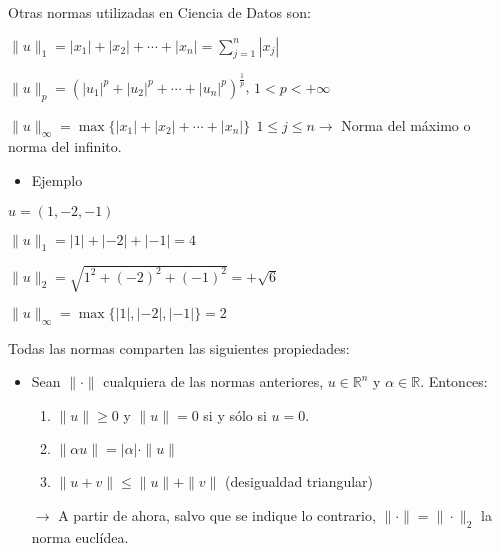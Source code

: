 \documentclass[12pt]{article}
\begin{document}
Otras normas utilizadas en Ciencia de Datos son:

$\|u\|_1=|x_1|+|x_2|+\cdots+|x_n|=\sum_{j=1}^{n}|x_j|$

$\|u\|_p=\left(|u_1|^p+|u_2|^p+\cdots+|u_n|^p\right)^{\frac{1}{p}}$,
$1<p<+\infty$

$\|u\|_{\infty}=\max\{|x_1|+|x_2|+\cdots+|x_n|\}~~1\le j\le
n\longrightarrow$ Norma del máximo o norma del infinito.

\begin{itemize}[label=\color{red}\textbullet, leftmargin=*]
    \item \color{lightblue} Ejemplo
\end{itemize}

$u=(1,-2,-1)$

$\|u\|_1=|1|+|-2|+|-1|=4$

$\|u\|_2=\sqrt{1^2+(-2)^2+(-1)^2}=+\sqrt{6}$

$\|u\|_\infty=\max\{|1|,|-2|,|-1|\}=2$

Todas las normas comparten las siguientes propiedades:
\begin{itemize}
\item Sean $\|\cdot\|$ cualquiera de las normas anteriores,
$u\in\mathbb{R}^n$ y $\alpha\in\mathbb{R}$. Entonces:
          \begin{enumerate}[label=\alph*)]
              \item $\|u\|\ge0$ y $\|u\|=0$ si y sólo si $u=0$.
              \item $\|\alpha u\|=|\alpha|\cdot\|u\|$
\item $\|u+v\|\le\|u\|+\|v\|$ (desigualdad triangular)          \end{enumerate}
\item[$\longrightarrow$] A partir de ahora, salvo que se indique
lo contrario, $\|\cdot\|=\|\cdot\|_2$ la norma euclídea.
\end{itemize}
\end{document}
